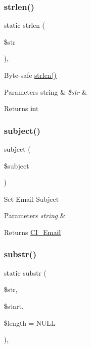 \subsubsection{\texorpdfstring{strlen()}{strlen()}}
{\footnotesize\ttfamily static strlen (\begin{DoxyParamCaption}\item[{}]{\$str }\end{DoxyParamCaption})\hspace{0.3cm}{\ttfamily [static]}, {\ttfamily [protected]}}

Byte-\/safe \mbox{\hyperlink{class_c_i___email_a4c29a687d4ed62c26a10e41d98930d5f}{strlen()}}


\begin{DoxyParams}[1]{Parameters}
string & {\em \$str} & \\
\hline
\end{DoxyParams}
\begin{DoxyReturn}{Returns}
int 
\end{DoxyReturn}
\mbox{\label{class_c_i___email_aaa61b3aaa6cc4c90e26686e4bf41587a}} 
\subsubsection{\texorpdfstring{subject()}{subject()}}
{\footnotesize\ttfamily subject (\begin{DoxyParamCaption}\item[{}]{\$subject }\end{DoxyParamCaption})}

Set Email Subject


\begin{DoxyParams}{Parameters}
{\em string} & \\
\hline
\end{DoxyParams}
\begin{DoxyReturn}{Returns}
\mbox{\hyperlink{class_c_i___email}{C\+I\+\_\+\+Email}} 
\end{DoxyReturn}
\mbox{\label{class_c_i___email_a101caef57ef0b165da5747e2c2e6c9dc}} 
\subsubsection{\texorpdfstring{substr()}{substr()}}
{\footnotesize\ttfamily static substr (\begin{DoxyParamCaption}\item[{}]{\$str,  }\item[{}]{\$start,  }\item[{}]{\$length = {\ttfamily NULL} }\end{DoxyParamCaption})\hspace{0.3cm}{\ttfamily [static]}, {\ttfamily [protected]}}

